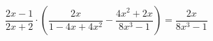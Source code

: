 \begin{ex}[type=equation]
	\begin{condition}
		$\dfrac{2x - 1}{2x + 2}\cdot\left(\dfrac{2x}{1 - 4x + 4x^2 } - \dfrac{4x^2 + 2x}{8x^3 - 1}\right) = \dfrac{2x}{8x^3 - 1}$
	\end{condition}
\end{ex}
